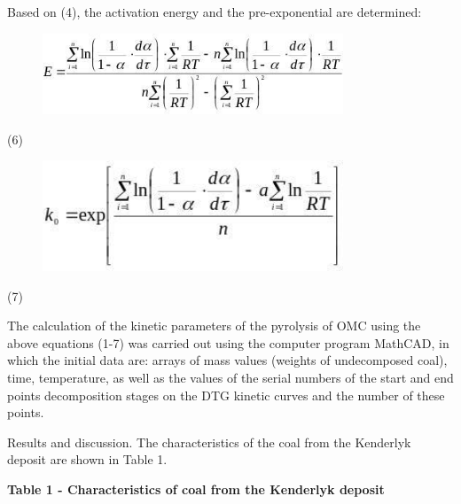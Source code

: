 Based on (4), the activation energy and the pre-exponential are
determined:

\begin{figure}[H]
	\centering
	\includegraphics[width=0.8\textwidth]{assets/1064}
	\caption*{}
\end{figure} (6)

\begin{figure}[H]
	\centering
	\includegraphics[width=0.8\textwidth]{assets/1065}
	\caption*{}
\end{figure} (7)

The calculation of the kinetic parameters of the pyrolysis of OMC using
the above equations (1-7) was carried out using the computer program
MathCAD, in which the initial data are: arrays of mass values (weights
of undecomposed coal), time, temperature, as well as the values of the
serial numbers of the start and end points decomposition stages on the
DTG kinetic curves and the number of these points.

Results and discussion. The characteristics of the coal from the
Kenderlyk deposit are shown in Table 1.

{\bfseries Table 1 - Characteristics of coal from the Kenderlyk deposit}

